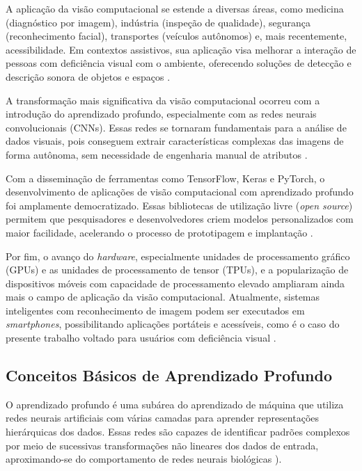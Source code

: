A aplicação da visão computacional se estende a diversas áreas, como medicina (diagnóstico por imagem), indústria (inspeção de qualidade), segurança (reconhecimento facial), transportes (veículos autônomos) e, mais recentemente, acessibilidade. Em contextos assistivos, sua aplicação visa melhorar a interação de pessoas com deficiência visual com o ambiente, oferecendo soluções de detecção e descrição sonora de objetos e espaços \cite{goodfellow2016}.

A transformação mais significativa da visão computacional ocorreu com a introdução do aprendizado profundo, especialmente com as redes neurais convolucionais (CNNs). Essas redes se tornaram fundamentais para a análise de dados visuais, pois conseguem extrair características complexas das imagens de forma autônoma, sem necessidade de engenharia manual de atributos \cite{gu2018}.

Com a disseminação de ferramentas como TensorFlow, Keras e PyTorch, o desenvolvimento de aplicações de visão computacional com aprendizado profundo foi amplamente democratizado. Essas bibliotecas de utilização livre (\textit{open source}) permitem que pesquisadores e desenvolvedores criem modelos personalizados com maior facilidade, acelerando o processo de prototipagem e implantação \cite{hassaballah2020}.

Por fim, o avanço do \textit{hardware}, especialmente unidades de processamento gráfico (GPUs) e as unidades de processamento de tensor (TPUs), e a popularização de dispositivos móveis com capacidade de processamento elevado ampliaram ainda mais o campo de aplicação da visão computacional. Atualmente, sistemas inteligentes com reconhecimento de imagem podem ser executados em \textit{smartphones}, possibilitando aplicações portáteis e acessíveis, como é o caso do presente trabalho voltado para usuários com deficiência visual \cite{geron2022}.

\subsection{Conceitos Básicos de Aprendizado Profundo}

O aprendizado profundo é uma subárea do aprendizado de máquina que utiliza redes neurais artificiais com várias camadas para aprender representações hierárquicas dos dados. Essas redes são capazes de identificar padrões complexos por meio de sucessivas transformações não lineares dos dados de entrada, aproximando-se do comportamento de redes neurais biológicas \cite{goodfellow2016}).

